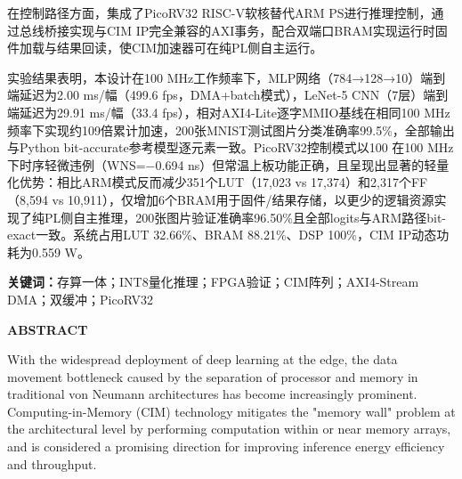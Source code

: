 \documentclass[12pt, a4paper]{article}
\begin{document}
在控制路径方面，集成了PicoRV32 RISC-V软核替代ARM PS进行推理控制，通过总线桥接实现与CIM IP完全兼容的AXI事务，配合双端口BRAM实现运行时固件加载与结果回读，使CIM加速器可在纯PL侧自主运行。

实验结果表明，本设计在100 MHz工作频率下，MLP网络（784→128→10）端到端延迟为2.00 ms/幅（499.6 fps，DMA+batch模式），LeNet-5 CNN（7层）端到端延迟为29.91 ms/幅（33.4 fps），相对AXI4-Lite逐字MMIO基线在相同100 MHz频率下实现约109倍累计加速，200张MNIST测试图片分类准确率99.5\%，全部输出与Python bit-accurate参考模型逐元素一致。PicoRV32控制模式以100 在100 MHz下时序轻微违例（WNS=$-$0.694 ns）但常温上板功能正确，且呈现出显著的轻量化优势：相比ARM模式反而减少351个LUT（17,023 vs 17,374）和2,317个FF（8,594 vs 10,911），仅增加6个BRAM用于固件/结果存储，以更少的逻辑资源实现了纯PL侧自主推理，200张图片验证准确率96.50\%且全部logits与ARM路径bit-exact一致。系统占用LUT 32.66\%、BRAM 88.21\%、DSP 100\%，CIM IP动态功耗为0.559 W。

\vspace{1em}
\noindent\textbf{关键词：}存算一体；INT8量化推理；FPGA验证；CIM阵列；AXI4-Stream DMA；双缓冲；PicoRV32

\newpage

\begin{center}
	{\large\bfseries ABSTRACT}
\end{center}

With the widespread deployment of deep learning at the edge, the data movement bottleneck caused by the separation of processor and memory in traditional von Neumann architectures has become increasingly prominent. Computing-in-Memory (CIM) technology mitigates the "memory wall" problem at the architectural level by performing computation within or near memory arrays, and is considered a promising direction for improving inference energy efficiency and throughput.
\end{document}
